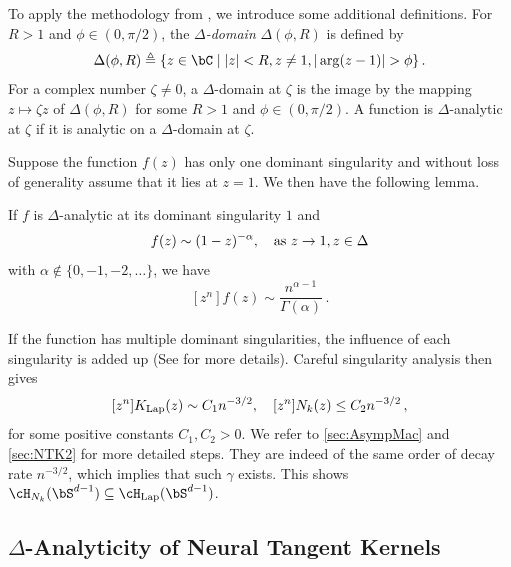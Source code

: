 \documentclass[11pt]{article}
\newcommand{\hlap}{\cH_{\textnormal{Lap}}}
\newcommand{\klap}{K_{\textnormal{Lap}}}
\begin{document}
To apply the methodology from \citep{flajolet2009analytic}, we introduce some additional definitions. For $R>1$ and $\phi\in (0,\pi/2)$, the \emph{$\Delta$-domain} $\Delta(\phi,R)$ is defined by \[
\Delta(\phi,R) \triangleq \{ z\in \bC \mid |z|<R, z\ne 1, |\arg(z-1)|>\phi \}\,.
\]
For a complex number $\zeta\not=0$, a $\Delta$-domain at $\zeta$ is the image by the mapping $z\mapsto \zeta z$ of $\Delta(\phi,R)$ for some $R>1$ and $\phi\in (0,\pi/2)$. A function is $\Delta$-analytic at $\zeta$ if it is analytic on a $\Delta$-domain at $\zeta$. 

Suppose the function $f(z)$ has only one dominant singularity and  without loss of generality assume that it lies at $z=1$. We then have the following lemma.

\begin{lemma}\label{lem:single-singularity}
 If $f$ is  $\Delta$-analytic at its dominant singularity $1$ and  \[
f(z)\sim (1-z)^{-\alpha},\quad {\rm as}~ z\to 1, z\in\Delta
\]
with $\alpha\notin \{0,-1,-2,\dots \}$, we have \[
[z^n]f(z) \sim \frac{n^{\alpha-1}}{\Gamma(\alpha)}\,.
\]
\end{lemma}
If the function has multiple dominant singularities, the influence of each singularity is added up (See \cite[Theorem VI.5]{flajolet2009analytic} for more details). Careful singularity analysis then gives
\[
[z^n]\klap(z)\sim C_1 n^{-3/2}, \quad [z^n]N_k(z)\leq C_2 n^{-3/2}\,,
\]
for some positive constants $C_1,C_2>0$. We refer to \cref{sec:AsympMac} and \cref{sec:NTK2} for more detailed steps. They are indeed of the same order of decay rate $n^{-3/2}$, which implies that such $\gamma$ exists. This shows $\cH_{N_k}(\bS^{d-1})\subseteq \hlap(\bS^{d-1})$. 








\subsection{$\Delta$-Analyticity of Neural Tangent Kernels}
\end{document}

